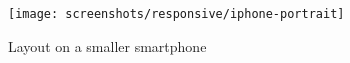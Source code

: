 \begin{figure}[h]
    \centering
    \texttt{[image: screenshots/responsive/iphone-portrait]}
    \caption{Layout on a smaller smartphone}
    \label{fig:responsive-iphone}
\end{figure}




